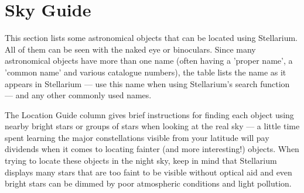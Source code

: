 
\chapter{Sky Guide}

This section lists some astronomical objects that can be located using
Stellarium. All of them can be seen with the naked eye or binoculars.
Since many astronomical objects have more than one name (often having a
'proper name', a 'common name' and various catalogue numbers), the table
lists the name as it appears in Stellarium --- use this name when using
Stellarium's search function --- and any other commonly used names.

The Location Guide column gives brief instructions for finding each
object using nearby bright stars or groups of stars when looking at the
real sky --- a little time spent learning the major constellations
visible from your latitude will pay dividends when it comes to locating
fainter (and more interesting!) objects. When trying to locate these
objects in the night sky, keep in mind that Stellarium displays many
stars that are too faint to be visible without optical aid and even
bright stars can be dimmed by poor atmospheric conditions and light
pollution.

